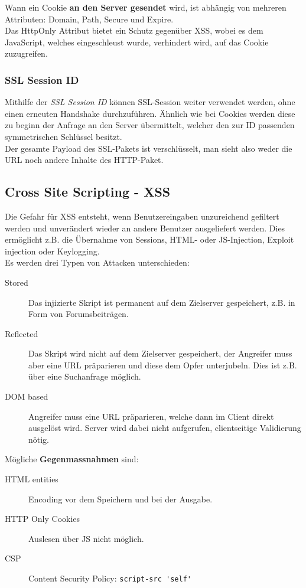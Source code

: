 Wann ein Cookie \textbf{an den Server gesendet} wird, ist abhängig von mehreren Attributen: Domain, Path, Secure und Expire.\\
Das HttpOnly Attribut bietet ein Schutz gegenüber XSS, wobei es dem JavaScript, welches eingeschleust wurde, verhindert wird, auf das Cookie zuzugreifen.

\subsubsection{SSL Session ID}
Mithilfe der \textit{SSL Session ID} können SSL-Session weiter verwendet werden, ohne einen erneuten Handshake durchzuführen. Ähnlich wie bei Cookies werden diese zu beginn der Anfrage an den Server übermittelt, welcher den zur ID passenden symmetrischen Schlüssel besitzt.\\
Der gesamte Payload des SSL-Pakets ist verschlüsselt, man sieht also weder die URL noch andere Inhalte des HTTP-Paket.

\subsection{Cross Site Scripting - XSS}
Die Gefahr für XSS entsteht, wenn Benutzereingaben unzureichend gefiltert werden und unverändert wieder an andere Benutzer ausgeliefert werden. Dies ermöglicht z.B. die Übernahme von Sessions, HTML- oder JS-Injection, Exploit injection oder Keylogging.\\
Es werden drei Typen von Attacken unterschieden:
\begin{description}
	\item[Stored] Das injizierte Skript ist permanent auf dem Zielserver gespeichert, z.B. in Form von Forumsbeiträgen.
	\item[Reflected] Das Skript wird nicht auf dem Zielserver gespeichert, der Angreifer muss aber eine URL präparieren und diese dem Opfer unterjubeln. Dies ist z.B. über eine Suchanfrage möglich.
	\item[DOM based] Angreifer muss eine URL präparieren, welche dann im Client direkt ausgelöst wird. Server wird dabei nicht aufgerufen, clientseitige Validierung nötig.
\end{description}

Mögliche \textbf{Gegenmassnahmen} sind:
\begin{description}
	\item[HTML entities] Encoding vor dem Speichern und bei der Ausgabe.
	\item[HTTP Only Cookies] Auslesen über JS nicht möglich.
	\item[CSP] Content Security Policy: \lstinline|script-src 'self'|
\end{description}

